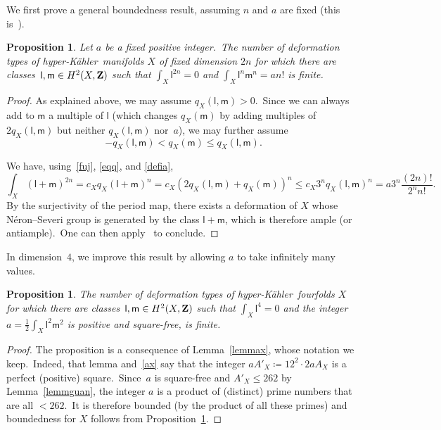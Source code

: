 \documentclass[12pt]{amsart}
\def\Z{{\bf Z}}
\def\hk{hyper-K\"ahler}
\newtheorem{prop}[lemm]{Proposition}
\theoremstyle{remark}
\def\lll{\ensuremath{\mathsf l}}
\def\mm{\ensuremath{\mathsf m}}
\begin{document}
We first prove a general boundedness result, assuming $n$ and $a$ are fixed (this is~\cite[Theorem~4.9]{kam}).

\begin{prop}\label{prop41}
Let $a$ be a fixed positive integer.\
The number of deformation types of \hk\ manifolds $X$ of fixed dimension $2n$ for which there are classes~$\lll,\mm\in H^2(X,\Z)$ such that $\int_X \lll^{2n}=0$ and $\int_X \lll^{n}\mm^{n}=an!$ is finite.
\end{prop}

\begin{proof}
As explained above, we may assume $q_X(\lll,\mm)>0$.\
Since we can always add to $\mm$ a  multiple of $\lll$ (which changes $q_X(\mm)$ by adding multiples of $2q_X(\lll,\mm)$ but neither $q_X(\lll,\mm)$ nor~$a$), we may further assume
\begin{equation}\label{eqq}
-q_X(\lll,\mm)<q_X(\mm)\le q_X(\lll,\mm).
\end{equation}

We have, using~\eqref{fuj}, \eqref{eqq}, and \eqref{defia},
\begin{equation*}
\int_X(\lll+\mm)^{2n}=c_X q_X(\lll+\mm)^n =c_X(2 q_X(\lll,\mm)+q_X(\mm) )^n\le c_X 3^n q_X(\lll,\mm)^n= a 3^n\frac{(2n)!}{2^nn!}  .
\end{equation*}
By the surjectivity of the period map, there exists a deformation of $X$ whose N\'eron--Severi group is generated by the class $\lll+\mm$, which is therefore ample (or antiample).\
One can then apply~\cite[Corollary~1.2]{huyf} to conclude.
\end{proof}



 In dimension~$4$, we improve this result by allowing $a$ to take infinitely many values.\


\begin{prop}\label{prop42}
The number of deformation types of  \hk\ fourfolds $X$   for which there are classes~$\lll, \mm\in H^2(X,\Z)$ such that   \mbox{$\int_X \lll^4=0$} and  the   integer $a= \frac{1}{2}\int_X \lll^{2}\mm^{2}$ is positive and square-free, is finite.\end{prop}



\begin{proof}
The proposition is a consequence of Lemma~\ref{lemmax}, whose notation we keep.\ Indeed, that lemma and~\eqref{ax}
 say that the integer $aA'_X\coloneqq 12^2 \cdot 2aA_X$ is a perfect (positive) square.\
Since~$a$ is square-free and $A'_X\le 262$ by Lemma~\ref{lemmguan}, the integer $a$ is a product of (distinct) prime numbers that are all $<262$.\
It is therefore bounded (by the product of all these primes) and boundedness for $X$ follows from Proposition~\ref{prop41}.
\end{proof}
\end{document}
